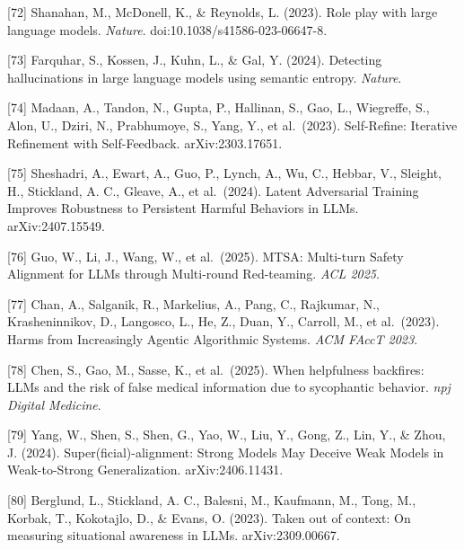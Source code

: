 {[}72{]} Shanahan, M., McDonell, K., \& Reynolds, L. (2023). Role play with large language models. \emph{Nature}. doi:10.1038/s41586-023-06647-8.

{[}73{]} Farquhar, S., Kossen, J., Kuhn, L., \& Gal, Y. (2024). Detecting hallucinations in large language models using semantic entropy. \emph{Nature}.

{[}74{]} Madaan, A., Tandon, N., Gupta, P., Hallinan, S., Gao, L., Wiegreffe, S., Alon, U., Dziri, N., Prabhumoye, S., Yang, Y., et al.~(2023). Self-Refine: Iterative Refinement with Self-Feedback. arXiv:2303.17651.

{[}75{]} Sheshadri, A., Ewart, A., Guo, P., Lynch, A., Wu, C., Hebbar, V., Sleight, H., Stickland, A. C., Gleave, A., et al.~(2024). Latent Adversarial Training Improves Robustness to Persistent Harmful Behaviors in LLMs. arXiv:2407.15549.

{[}76{]} Guo, W., Li, J., Wang, W., et al.~(2025). MTSA: Multi-turn Safety Alignment for LLMs through Multi-round Red-teaming. \emph{ACL 2025}.

{[}77{]} Chan, A., Salganik, R., Markelius, A., Pang, C., Rajkumar, N., Krasheninnikov, D., Langosco, L., He, Z., Duan, Y., Carroll, M., et al.~(2023). Harms from Increasingly Agentic Algorithmic Systems. \emph{ACM FAccT 2023}.

{[}78{]} Chen, S., Gao, M., Sasse, K., et al.~(2025). When helpfulness backfires: LLMs and the risk of false medical information due to sycophantic behavior. \emph{npj Digital Medicine}.

{[}79{]} Yang, W., Shen, S., Shen, G., Yao, W., Liu, Y., Gong, Z., Lin, Y., \& Zhou, J. (2024). Super(ficial)-alignment: Strong Models May Deceive Weak Models in Weak-to-Strong Generalization. arXiv:2406.11431.

{[}80{]} Berglund, L., Stickland, A. C., Balesni, M., Kaufmann, M., Tong, M., Korbak, T., Kokotajlo, D., \& Evans, O. (2023). Taken out of context: On measuring situational awareness in LLMs. arXiv:2309.00667.
